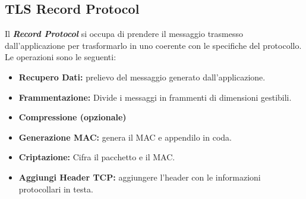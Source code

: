 \subsection{TLS Record Protocol}
Il \textbf{\textit{Record Protocol}} si occupa di prendere il messaggio trasmesso dall'applicazione per trasformarlo in uno coerente con le specifiche del protocollo. Le operazioni sono le seguenti:


\noindent\begin{minipage}{0.6\textwidth}
\vspace{4pt}
\begin{theorem}\label{thm:recordprotocolsnd}
\begin{itemize}
    \item \textbf{Recupero Dati:} prelievo del messaggio generato dall'applicazione.
    \item \textbf{Frammentazione:} Divide i messaggi in frammenti di dimensioni gestibili.
    \item \textbf{Compressione (opzionale)}
    \item \textbf{Generazione MAC:} genera il MAC e appendilo in coda.
    \item \textbf{Criptazione:} Cifra il pacchetto e il MAC.
    \item \textbf{Aggiungi Header TCP:} aggiungere l'header con le informazioni protocollari in testa.
\end{itemize}
\end{theorem}
\end{minipage}
\hspace{0.05\textwidth}
